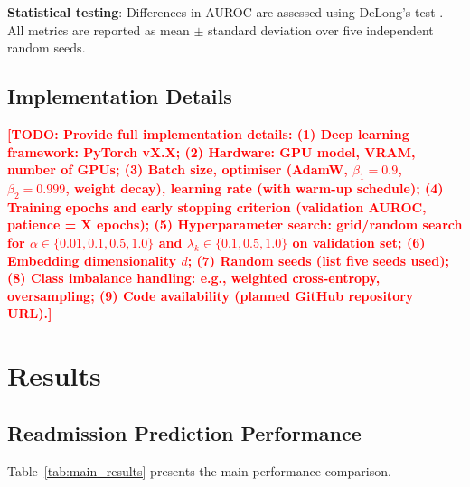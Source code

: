 \documentclass[review,12pt,authoryear]{elsarticle}
\newcommand{\todo}[1]{\textcolor{red}{\textbf{[TODO: #1]}}}
\begin{document}
\textbf{Statistical testing}: Differences in AUROC are assessed using DeLong's test \citep{delong1988comparing}.
All metrics are reported as mean $\pm$ standard deviation over five independent random seeds.

\subsection{Implementation Details}

\todo{Provide full implementation details:
(1) Deep learning framework: PyTorch vX.X;
(2) Hardware: GPU model, VRAM, number of GPUs;
(3) Batch size, optimiser (AdamW, $\beta_1=0.9$, $\beta_2=0.999$, weight decay), learning rate (with warm-up schedule);
(4) Training epochs and early stopping criterion (validation AUROC, patience = X epochs);
(5) Hyperparameter search: grid/random search for $\alpha \in \{0.01, 0.1, 0.5, 1.0\}$ and $\lambda_k \in \{0.1, 0.5, 1.0\}$ on validation set;
(6) Embedding dimensionality $d$;
(7) Random seeds (list five seeds used);
(8) Class imbalance handling: e.g., weighted cross-entropy, oversampling;
(9) Code availability (planned GitHub repository URL).}

\section{Results}
\label{sec:results}

\subsection{Readmission Prediction Performance}

Table~\ref{tab:main_results} presents the main performance comparison.
\end{document}
